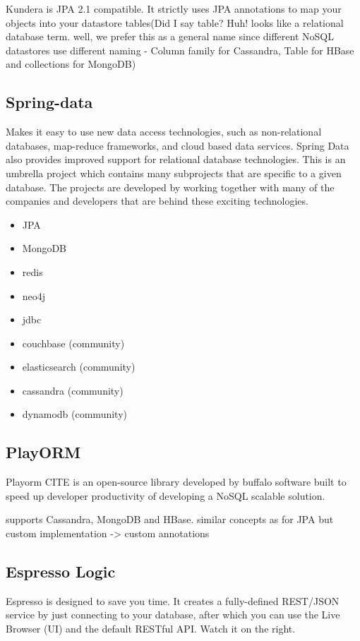 Kundera is JPA 2.1 compatible. It strictly uses JPA annotations to map your objects into your datastore tables(Did I say table? Huh! looks like a relational database term. well, we prefer this as a general name since different NoSQL datastores use different naming - Column family for Cassandra, Table for HBase and collections for MongoDB)

\subsection{Spring-data}
Makes it easy to use new data access technologies, such as non-relational databases, map-reduce frameworks, and cloud based data services. Spring Data also provides improved support for relational database technologies. This is an umbrella project which contains many subprojects that are specific to a given database. The projects are developed by working together with many of the companies and developers that are behind these exciting technologies.

\begin{itemize}
\item JPA
\item MongoDB
\item redis
\item neo4j
\item jdbc
\item couchbase (community)
\item elasticsearch (community)
\item cassandra (community)
\item dynamodb (community)
\end{itemize}

\subsection{PlayORM}
Playorm  CITE is an open-source library developed by buffalo software built to speed up developer productivity of developing a NoSQL scalable solution. 

supports Cassandra, MongoDB and HBase.
similar concepts as for JPA but custom implementation -> custom annotations

\subsection{Espresso Logic}
Espresso is designed to save you time.  It creates a fully-defined REST/JSON service by just connecting to your database, after which you can use the Live Browser (UI) and the default RESTful API.   Watch it on the right.

